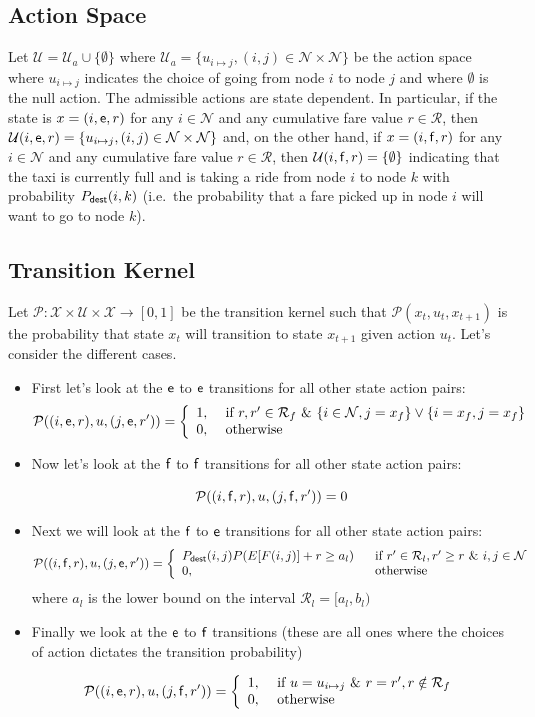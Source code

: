 \documentclass{article}
\newcommand{\mc}{\mathcal}
\newcommand{\rar}{\rightarrow}
\newcommand{\sn}[1]{{\sf{#1}}}
\newcommand{\e}{{\sf e}}
\newcommand{\f}{{\sf f}}
\newcommand{\Pdest}{P_{\text{\sn{dest}}}}
\begin{document}
\subsection{Action Space}
Let $\mc{U}=\mc{U}_a\cup\{\emptyset\}$ where
$\mc{U}_a=\{u_{i\mapsto j}, (i,j)\in \mc{N}\times \mc{N}\}$ be the action space where $u_{i\mapsto j}$ indicates the choice of going from node $i$ to node $j$ and where $\emptyset$ is the null action. The admissible actions are state dependent. In particular, if the state is $x=(i,\e,r)$ for any $i\in
\mc{N}$ and any cumulative fare value $r\in\mc{R}$, then $\mc{U}(i,\e,r)=\{u_{i\mapsto j}, (i,j)\in \mc{N}\times \mc{N}\}$ and, on the other hand, if $x=(i,\f,r)$ for any $i\in \mc{N}$ and any cumulative fare value $r\in\mc{R}$, then
$\mc{U}(i,\f,r)=\{\emptyset\}$ indicating that the taxi is currently full and is taking a ride from node $i$ to node $k$ with probability $\Pdest(i,k)$ (i.e.~the probability that a fare picked up in node $i$ will want to go to node $k$).

\subsection{Transition Kernel}
Let $\mc{P}: \mc{X}\times \mc{U}\times\mc{X}\rar [0,1]$ be the transition kernel such that $\mc{P}(x_{t},u_t, x_{t+1})$ is the probability that state $x_t$ will transition to state $x_{t+1}$ given action $u_t$. Let's consider the different cases. 
\begin{itemize}
\item First let's look at the $\e$ to $\e$ transitions for all other state action pairs:
\[\mc{P}( (i,\e,r),u,(j,\e,r'))=\left\{\begin{array}{ll} 1, & \ \text{if}\ r,r'\in \mc{R}_f\ \text{\&}\ \{i\in \mc{N},j=x_f\}\vee\{i=x_f,j=x_f\}\\
0, & \ \text{otherwise}\end{array}\right.\]

\item Now let's look at the $\f$ to $\f$ transitions for all other state action pairs:

\[\mc{P}( (i,\f,r),u,(j,\f,r'))=0\]
\item Next we will look at the $\f$ to $\e$ transitions for all other state action pairs:
\[\mc{P}((i,\f,r),u,(j,\e,r'))=\left\{\begin{array}{ll}
\Pdest(i,j)P(E[F(i,j)]+r\geq a_l)\ & \ \text{if}\ r'\in \mc{R}_l, r'\geq r\ \text{\&}\ i,j\in \mc{N}\\ 0, & \ \text{otherwise} \end{array}\right.\]
where $a_l$ is the lower bound on the interval
$\mc{R}_l=[a_l,b_l)$
\item Finally we look at the $\e$ to $\f$ transitions (these are all ones where the choices of action dictates the transition probability)

\[\mc{P}( (i,\e,r),u,(j,\f,r'))=\left\{\begin{array}{ll} 1, & \ \text{if}\ u=u_{i\mapsto j}\ \text{\&}\ r=r', r\notin \mc{R}_f\\
0, & \ \text{otherwise}\end{array}\right.\]
\end{itemize}
\end{document}

